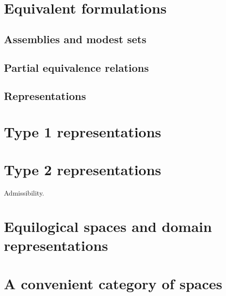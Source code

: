 \section{Equivalent formulations}
\label{sec:representations-formulations}

\subsection{Assemblies and modest sets}
\label{sec:assemblies}

\subsection{Partial equivalence relations}
\label{sec:pers}

\subsection{Representations}
\label{sec:representations}


\section{Type 1 representations}
\label{sec:type-1-representations}

\section{Type 2 representations}
\label{sec:tte-representations}

Admissibility.

\section{Equilogical spaces and domain representations}
\label{sec:equilogical-spaces}

\section{A convenient category of spaces}
\label{sec:qcb-spaces}



